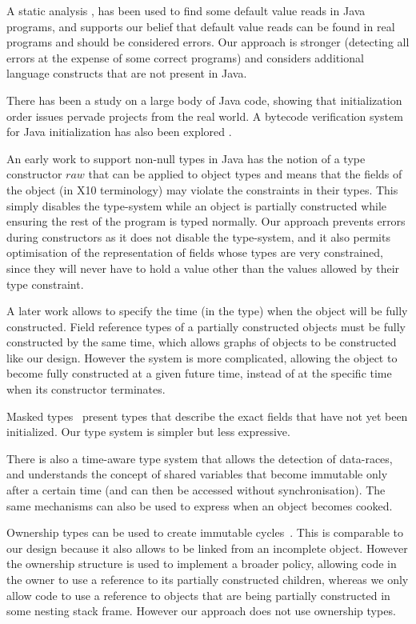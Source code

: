 A static analysis \cite{Seo:2007:SBD:1522565.1522587}, has been used to find
some default value reads in Java programs, and supports our belief that default
value reads can be found in real programs and should be considered errors.  Our
approach is stronger (detecting all errors at the expense of some correct
programs) and considers additional language constructs that are not present in
Java.

There has been a study on a large body \cite{Gil:2009:WRS:1615184.1615216} of
Java code, showing that initialization order issues pervade projects from the
real world.  A bytecode verification system for Java initialization has also
been explored \cite{Hubert:2010:ESO:1888881.1888890}.

An early work to support non-null types in Java
\cite{Fahndrich:2003:DCN:949305.949332} has the notion of a type constructor
$raw$ that can be applied to object types and means that the fields of the
object (in X10 terminology) may violate the constraints in their types.  This
simply disables the type-system while an object is partially constructed while
ensuring the rest of the program is typed normally.  Our approach prevents
errors during constructors as it does not disable the type-system, and it also
permits optimisation of the representation of fields whose types are very
constrained, since they will never have to hold a value other than the values
allowed by their type constraint.

A later work \cite{Fahndrich:2007:EOI:1297027.1297052,XinQi:2009} allows
    to specify the time
    (in the type) when the object will be fully constructed.
Field reference types of a partially constructed objects must be fully
constructed by the same time, which allows graphs of objects to be constructed
like our  design.  However the system is more complicated, allowing
the object to become fully constructed at a given future time, instead of at
the specific time when its constructor terminates.

Masked types~\cite{XinQi:2009} present types that
    describe the exact fields that have not yet been initialized.
Our type system is simpler but less expressive.

There is also a time-aware type system \cite{Matsakis:2010:TTS:1869459.1869511}
that allows the detection of data-races, and understands the concept of shared
variables that become immutable only after a certain time
(and can then be accessed without synchronisation).  The same mechanisms can also be
used to express when an object becomes cooked.

Ownership types can be used to create immutable cycles~\cite{Zibin:2010:OIG:1869459.1869509}.
This is comparable to
our  design because it also allows  to be linked from an
incomplete object.  However the ownership structure is used to implement a
broader policy, allowing code in the owner to use a reference to its partially
constructed children, whereas we only allow code to use a reference to objects
that are being partially constructed in some nesting stack frame.  However our
approach does not use ownership types.
